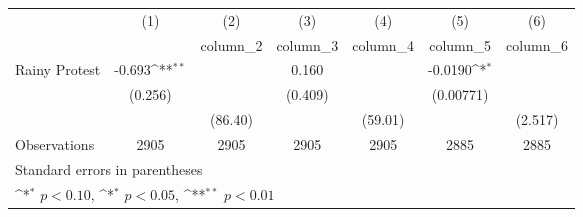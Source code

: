 {
\def\sym#1{\ifmmode^{#1}\else\(^{#1}\)\fi}
\begin{tabular}{l*{6}{c}}
\hline\hline
                &\multicolumn{1}{c}{(1)}&\multicolumn{1}{c}{(2)}&\multicolumn{1}{c}{(3)}&\multicolumn{1}{c}{(4)}&\multicolumn{1}{c}{(5)}&\multicolumn{1}{c}{(6)}\\
                &\multicolumn{1}{c}{}&\multicolumn{1}{c}{column\_2}&\multicolumn{1}{c}{column\_3}&\multicolumn{1}{c}{column\_4}&\multicolumn{1}{c}{column\_5}&\multicolumn{1}{c}{column\_6}\\
\hline
Rainy Protest   &   -0.693\sym{**}&                 &    0.160        &                 &  -0.0190\sym{*} &                 \\
                &  (0.256)        &                 &  (0.409)        &                 &(0.00771)        &                 \\
                &                 &  (86.40)        &                 &  (59.01)        &                 &  (2.517)        \\
\hline
Observations    &     2905        &     2905        &     2905        &     2905        &     2885        &     2885        \\
\hline\hline
\multicolumn{7}{l}{\footnotesize Standard errors in parentheses}\\
\multicolumn{7}{l}{\footnotesize \sym{*} \(p<0.10\), \sym{*} \(p<0.05\), \sym{**} \(p<0.01\)}\\
\end{tabular}
}
